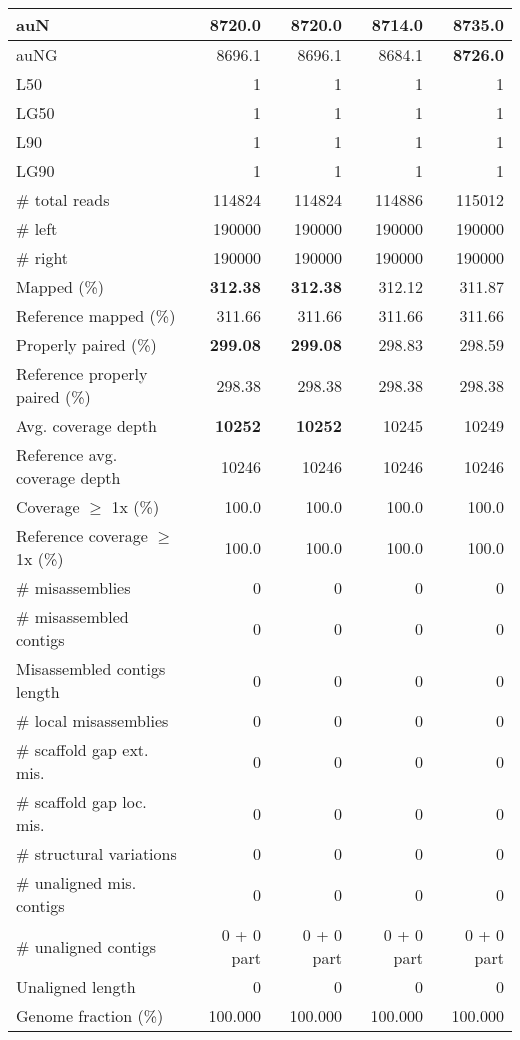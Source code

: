 \documentclass[12pt,a4paper]{article}
\begin{document}
\begin{table}[ht]
\begin{center}
\begin{tabular}{|l*{4}{|r}|}
auN & 8720.0 & 8720.0 & 8714.0 & {\bf 8735.0} \\ \hline
auNG & 8696.1 & 8696.1 & 8684.1 & {\bf 8726.0} \\ \hline
L50 & 1 & 1 & 1 & 1 \\ \hline
LG50 & 1 & 1 & 1 & 1 \\ \hline
L90 & 1 & 1 & 1 & 1 \\ \hline
LG90 & 1 & 1 & 1 & 1 \\ \hline
\# total reads & 114824 & 114824 & 114886 & 115012 \\ \hline
\# left & 190000 & 190000 & 190000 & 190000 \\ \hline
\# right & 190000 & 190000 & 190000 & 190000 \\ \hline
Mapped (\%) & {\bf 312.38} & {\bf 312.38} & 312.12 & 311.87 \\ \hline
Reference mapped (\%) & 311.66 & 311.66 & 311.66 & 311.66 \\ \hline
Properly paired (\%) & {\bf 299.08} & {\bf 299.08} & 298.83 & 298.59 \\ \hline
Reference properly paired (\%) & 298.38 & 298.38 & 298.38 & 298.38 \\ \hline
Avg. coverage depth & {\bf 10252} & {\bf 10252} & 10245 & 10249 \\ \hline
Reference avg. coverage depth & 10246 & 10246 & 10246 & 10246 \\ \hline
Coverage $\geq$ 1x (\%) & 100.0 & 100.0 & 100.0 & 100.0 \\ \hline
Reference coverage $\geq$ 1x (\%) & 100.0 & 100.0 & 100.0 & 100.0 \\ \hline
\# misassemblies & 0 & 0 & 0 & 0 \\ \hline
\# misassembled contigs & 0 & 0 & 0 & 0 \\ \hline
Misassembled contigs length & 0 & 0 & 0 & 0 \\ \hline
\# local misassemblies & 0 & 0 & 0 & 0 \\ \hline
\# scaffold gap ext. mis. & 0 & 0 & 0 & 0 \\ \hline
\# scaffold gap loc. mis. & 0 & 0 & 0 & 0 \\ \hline
\# structural variations & 0 & 0 & 0 & 0 \\ \hline
\# unaligned mis. contigs & 0 & 0 & 0 & 0 \\ \hline
\# unaligned contigs & 0 + 0 part & 0 + 0 part & 0 + 0 part & 0 + 0 part \\ \hline
Unaligned length & 0 & 0 & 0 & 0 \\ \hline
Genome fraction (\%) & 100.000 & 100.000 & 100.000 & 100.000 \\ \hline

\end{tabular}
\end{center}
\end{table}
\end{document}
